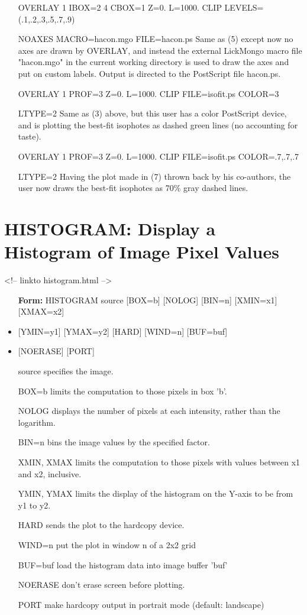 \begin{itemize}
  \item[OVERLAY 1 IBOX=2 4 CBOX=1 Z=0. L=1000. 
        CLIP LEVELS=(.1,.2,.3,.5,.7,.9)\hfill]{}
  \item[NOAXES MACRO=hacon.mgo FILE=hacon.ps\hfill]{
   Same as (5) except now no axes are drawn by OVERLAY, and instead the
   external LickMongo macro file "hacon.mgo" in the current working 
   directory is used to draw the axes and put on custom labels.  Output
   is directed to the PostScript file hacon.ps.}
  \item[OVERLAY 1 PROF=3 Z=0. L=1000. CLIP FILE=isofit.ps COLOR=3\hfill]{}
  \item[LTYPE=2\hfill]{
   Same as (3) above, but this user has a color PostScript device, and
   is plotting the best-fit isophotes as dashed green lines (no accounting
   for taste).  }
  \item[OVERLAY 1 PROF=3 Z=0. L=1000. CLIP FILE=isofit.ps 
        COLOR=.7,.7,.7\hfill]{} 
  \item[LTYPE=2\hfill]{
   Having the plot made in (7) thrown back by his co-authors, the user
   now draws the best-fit isophotes as 70\% gray dashed lines.}
\end{itemize}

\section{HISTOGRAM: Display a Histogram of Image Pixel Values}
\begin{rawhtml}
<!-- linkto histogram.html -->
\end{rawhtml}
\begin{itemize}
  \item[\textbf{Form:}   HISTOGRAM source {[BOX=b]} {[NOLOG]} {[BIN=n]} {[XMIN=x1]} {[XMAX=x2]}\hfill]{}
  \item{{[YMIN=y1]} {[YMAX=y2]} {[HARD]} {[WIND=n]} {[BUF=buf]}}
  \item{{[NOERASE]} {[PORT]}}
  \item[source\hfill]{   specifies the image.}
  \item[BOX=b\hfill]{limits the computation to those pixels in box 'b'.}
  \item[NOLOG\hfill]{displays the number of pixels at each intensity,
rather than the logarithm.}
  \item[BIN=n\hfill]{   bins the image values by the specified factor.}
  \item[XMIN, XMAX\hfill]{  limits the computation to those pixels with values
between x1 and x2, inclusive.}
  \item[YMIN, YMAX   \hfill]{   limits the display of the histogram on the Y-axis
to be from y1 to y2.}
  \item[HARD\hfill]{sends the plot to the hardcopy device.}
  \item[WIND=n\hfill]{put the plot in window n of a 2x2 grid}
  \item[BUF=buf\hfill]{  load the histogram data into image buffer 'buf'}
  \item[   NOERASE   \hfill]{don't erase screen before plotting.}
  \item[PORT\hfill]{make hardcopy output in portrait mode (default: landscape)}
\end{itemize}

